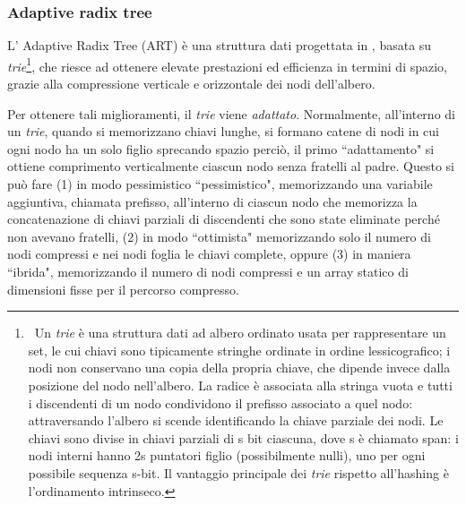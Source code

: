\documentclass[../main.tex]{subfiles}
\begin{document}
\subsubsection{Adaptive radix tree}
\label{AdaptiveRadixTree}

L' Adaptive Radix Tree (ART) è una struttura dati progettata in \cite{leis2013art}, basata su \textit{trie}\footnote{\ Un \textit{trie} è una struttura dati ad albero ordinato usata per rappresentare un set, le cui chiavi sono tipicamente stringhe ordinate in ordine lessicografico; i nodi non conservano una copia della propria chiave, che dipende invece dalla posizione del nodo nell'albero. La radice è associata alla stringa vuota e tutti i discendenti di un nodo condividono il prefisso associato a quel nodo: attraversando l'albero si scende identificando la chiave parziale dei nodi. Le chiavi sono divise in chiavi parziali di s bit ciascuna, dove s è chiamato span: i nodi interni hanno 2s puntatori figlio (possibilmente nulli), uno per ogni possibile sequenza s-bit. Il vantaggio principale dei \textit{trie} rispetto all'hashing è l'ordinamento intrinseco.}, che riesce ad ottenere elevate prestazioni ed efficienza in termini di spazio, grazie alla compressione verticale e orizzontale dei nodi dell'albero. 

Per ottenere tali miglioramenti, il \textit{trie} viene \textit{adattato}. Normalmente, all'interno di un \textit{trie}, quando si memorizzano chiavi lunghe, si formano catene di nodi in cui ogni nodo ha un solo figlio sprecando spazio perciò, il primo ``adattamento" si ottiene comprimento verticalmente ciascun nodo senza fratelli al padre. Questo si può fare (1) in modo pessimistico ``pessimistico", memorizzando una variabile aggiuntiva, chiamata prefisso, all'interno di ciascun nodo che memorizza la concatenazione di chiavi parziali di discendenti che sono state eliminate perché non avevano fratelli, (2) in modo ``ottimista" memorizzando solo il numero di nodi compressi e nei nodi foglia le chiavi complete, oppure (3) in maniera ``ibrida", memorizzando il numero di nodi compressi e un array statico di dimensioni fisse per il percorso compresso.
\end{document}
